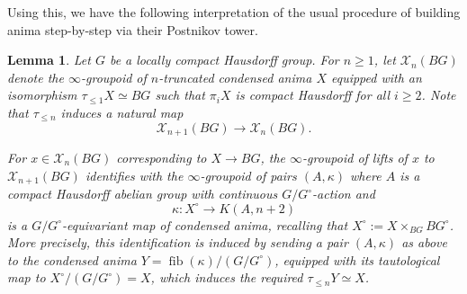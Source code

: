 \documentclass[12pt]{article}
\newtheorem{lemma}[theorem]{Lemma}
\theoremstyle{definition}
\newcommand{\on}{\operatorname}
\begin{document}
Using this, we have the following interpretation of the usual procedure of building anima step-by-step via their Postnikov tower.

\begin{lemma}\label{postchaus}
Let $G$ be a locally compact Hausdorff group.  For $n\geq 1$, let $\mathcal{X}_n(BG)$ denote the $\infty$-groupoid of $n$-truncated condensed anima $X$ equipped with an isomorphism $\tau_{\leq 1}X\simeq BG$ such that $\pi_iX$ is compact Hausdorff for all $i\geq 2$.  Note that $\tau_{\leq n}$ induces a natural map
$$\mathcal{X}_{n+1}(BG) \to \mathcal{X}_n(BG).$$

For $x\in \mathcal{X}_n(BG)$ corresponding to $X\to BG$, the $\infty$-groupoid of lifts of $x$ to $\mathcal{X}_{n+1}(BG)$ identifies with the $\infty$-groupoid of pairs $(A,\kappa)$ where $A$ is a compact Hausdorff abelian group with continuous $G/G^\circ$-action and
$$\kappa: X^\circ \to K(A,n+2)$$
is a $G/G^\circ$-equivariant map of condensed anima, recalling that $X^\circ := X\times_{BG} BG^\circ$.  More precisely, this identification is induced by sending a pair $(A,\kappa)$ as above to the condensed anima $Y = \on{fib}(\kappa)/(G/G^\circ)$, equipped with its tautological map to $X^\circ/(G/G^\circ) = X$, which induces the required $\tau_{\leq n}Y \simeq X$.
\end{lemma}
\end{document}
